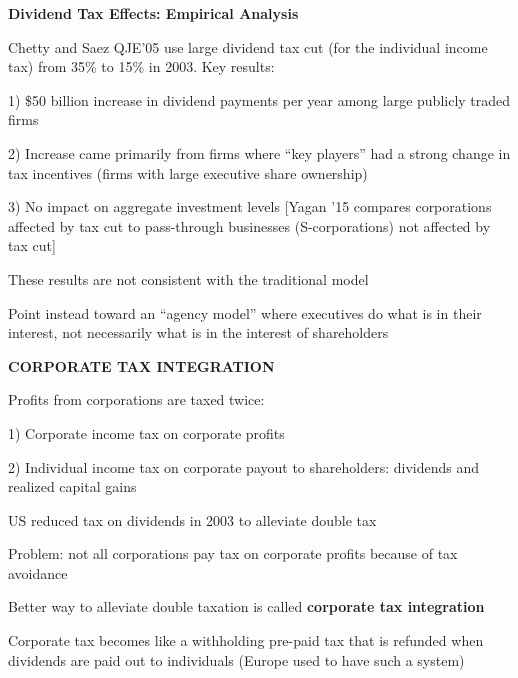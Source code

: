 \documentclass[landscape]{slides}
\begin{document}
%


\begin{slide}
\begin{center}
{\bf Dividend Tax Effects: Empirical Analysis}
\end{center}
Chetty and Saez QJE'05 use large dividend tax cut (for the individual income tax) from 35\% to 15\% in 2003. Key results:

1) \$50 billion increase in dividend payments per year among large publicly traded firms

2) Increase came primarily from firms where ``key players'' had a strong change in tax incentives
(firms with large executive share ownership)

3) No impact on aggregate investment levels [Yagan '15 compares corporations affected by tax cut
to pass-through businesses (S-corporations) not affected by tax cut]

\small
These results are not consistent with the traditional model

Point instead toward an ``agency model'' where executives do what is in their interest, not necessarily what is in the interest of shareholders

\end{slide}

\begin{slide}

\end{slide}

\begin{slide}

\end{slide}

\begin{slide}
\begin{center}
{\bf CORPORATE TAX INTEGRATION}
\end{center}
Profits from corporations are taxed twice:

1) Corporate income tax on corporate profits

2) Individual income tax on corporate payout to shareholders: dividends and realized capital gains

US reduced tax on dividends in 2003 to alleviate double tax

Problem: not all corporations pay tax on corporate profits because of tax avoidance

Better way to alleviate double taxation is called \textbf{corporate tax integration}

Corporate tax becomes like a withholding pre-paid tax that is refunded when dividends
are paid out to individuals (Europe used to have such a system)

\end{slide}
\end{document}
